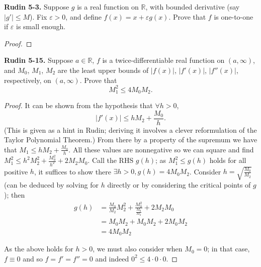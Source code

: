 \documentclass{article}
\newcommand{\R}{\mathbb{R}}
\newcommand{\abs}[1]{\left| #1 \right|}
\newcommand{\problem}[1]{\noindent \textbf{#1}}
\begin{document}

\problem{Rudin 5-3. }
Suppose $g$ is a real function on $\R$, with bounded derivative (say $\abs{g'} \le M$). Fix $\varepsilon > 0$, and define $f(x) = x + \varepsilon g(x)$. Prove that $f$ is one-to-one if $\varepsilon$ is small enough.

\begin{proof}
    
\end{proof}


\problem{Rudin 5-15. }
Suppose $a \in \R$, $f$ is a twice-differentiable real function on $(a, \infty)$, and $M_0$, $M_1$, $M_2$ are the least upper bounds of $\abs{f(x)}$, $\abs{f'(x)}$, $\abs{f''(x)}$, respectively, on $(a, \infty)$. Prove that
$$M_1^2 \le 4 M_0 M_2.$$

\begin{proof}
    It can be shown from the hypothesis that
    $\forall h > 0$,
    $$\abs{f'(x)} \le hM_2 + \frac{M_0}{h}.$$
    (This is given as a hint in Rudin; deriving it involves a clever reformulation of the Taylor Polynomial Theorem.) From there by a property of the supremum we have that $M_1 \le hM_2 + \frac{M_0}{h}$. All these values are nonnegative so we can square and find $M_1^2 \le h^2M_2^2 + \frac{M_0^2}{h^2} + 2M_2 M_0$. Call the RHS $g(h)$; as $M_1^2 \le g(h)$ holds for all positive $h$, it suffices to show there $\exists h > 0, g(h) = 4M_0 M_2$. Consider $h = \sqrt{\frac{M_0}{M_2}}$ (can be deduced by solving for $h$ directly or by considering the critical points of $g$); then
    \begin{align*}
        g(h) &= \frac{M_0}{M_2} M_2^2 + \frac{M_0^2}{\frac{M_0}{M_2}} + 2M_2 M_0 \\
        &= M_0 M_2 + M_0 M_2 + 2M_0 M_2 \\
        &= 4M_0 M_2         
    \end{align*}

    As the above holds for $h > 0$, we must also consider when $M_0 = 0$; in that case, $f \equiv 0$ and so $f = f' = f'' = 0$ and indeed $0^2 \le 4 \cdot 0 \cdot 0$.

\end{proof}
\end{document}
